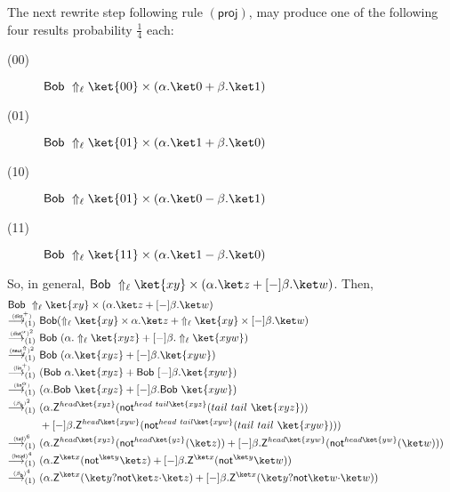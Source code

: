 \documentclass[preprint]{elsarticle}
\newcommand\lra[1][1]{\longrightarrow_{\left(#1\right)}}
\newcommand\ite[3]{{#1}?{#2}\mathord{\cdot}{#3}}
\newcommand\pair[2]{({#1}+{#2})}
\newcommand\npair[2]{({#1}-{#2})}
\newcommand\s[1]{\ensuremath{\mathsf{#1}}}
\newcommand\red[2][1]{\overset{\scriptscriptstyle\smash{#2}\vphantom{x}}{\lra[#1]}\ }
\newcommand\rbetab{(\s{\beta_b})}
\newcommand\rlinr{(\s{lin^+_r})}
\newcommand\rlinscalr{(\s{lin^\alpha_r})}
\newcommand\rcaneutl{(\s{neut^\Uparrow_\ell})}
\newcommand\rproj{(\s{proj})}
\newcommand\rhead{(\s{head})}
\newcommand\rtail{(\s{tail})}
\newcommand\rdistscall{(\s{dist^\alpha_l})}
\newcommand\rdistsuml{(\s{dist^+_l})}
\begin{document}
The next rewrite step following rule $\rproj$, may produce one of the following
four results probability $\frac 14$ each:
\begin{description}
\item[(00)] $\s{Bob}\ \Uparrow_\ell\ket{00}\times\pair{\alpha.\ket 0}{\beta.\ket
    1}$
\item[(01)] $\s{Bob}\ \Uparrow_\ell\ket{01}\times\pair{\alpha.\ket 1}{\beta.\ket
    0}$
\item[(10)] $\s{Bob}\ \Uparrow_\ell\ket{01}\times\npair{\alpha.\ket 0}{\beta.\ket
    1}$
\item[(11)] $\s{Bob}\ \Uparrow_\ell\ket{11}\times\npair{\alpha.\ket 1}{\beta.\ket
    0}$
\end{description}

So, in general, $\s{Bob}\ \Uparrow_\ell\ket{xy}\times\pair{\alpha.\ket
  z}{[-]\beta.\ket w}$. Then,
\begin{align*}
  \omit\rlap{$\s{Bob}\ \Uparrow_\ell\ket{xy}\times\pair{\alpha.\ket z}{[-]\beta.\ket w}$}\\
  \red{\rdistsuml} &
                     \s{Bob}\pair{\Uparrow_\ell\ket{xy}\times\alpha.\ket z}{\Uparrow_\ell\ket{xy}\times[-]\beta.\ket w}
  \\
  \red{\rdistscall^2} &
                        \s{Bob}\ \pair{\alpha.\Uparrow_\ell\ket{xyz}}{[-]\beta.\Uparrow_\ell\ket{xyw}}
  \\
  \red{\rcaneutl^2} &
                      \s{Bob}\ \pair{\alpha.\ket{xyz}}{[-]\beta.\ket{xyw}}
  \\
  \red{\rlinr} &
                 \pair{\s{Bob}\ \alpha.\ket{xyz}}{\s{Bob}\ [-]\beta.\ket{xyw}}
  \\
  \red{\rlinscalr} &
                     \pair{\alpha.\s{Bob}\ \ket{xyz}}{[-]\beta.\s{Bob}\ \ket{xyw}}
  \\
  \red{\rbetab^2} &
                    ({\alpha.\s Z^{head\ket{xyz}}(\s{not}^{head\ tail\ket{xyz}}(tail\ tail\ \ket{xyz}))}\\
                   &+[-]\beta.\s Z^{head\ket{xyw}}(\s{not}^{head\ tail\ket{xyw}}(tail\ tail\ \ket{xyw})))
  \\
  \red{\rtail^6} &
                   \pair
                   {\alpha.\s Z^{head\ket{xyz}}(\s{not}^{head\ket{yz}}(\ket z))}
                   {[-]\beta.\s Z^{head\ket{xyw}}(\s{not}^{head\ket{yw}}(\ket w))}
  \\
  \red{\rhead^4} &
                   \pair
                   {\alpha.\s Z^{\ket x}(\s{not}^{\ket y}\ket z)}
                   {[-]\beta.\s Z^{\ket x}(\s{not}^{\ket y}\ket w)}
  \\
  \red{\rbetab^4} &
                    \pair
                    {\alpha.\s Z^{\ket x}(\ite{\ket y}{\s{not}\ket z}{\ket z})}
                    {[-]\beta.\s Z^{\ket x}(\ite{\ket y}{\s{not}\ket w}{\ket w})}
\end{align*}
\end{document}
